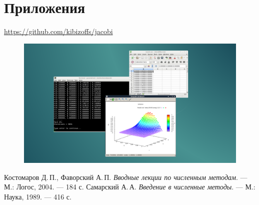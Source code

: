 \documentclass[a4paper, fleqn]{report}
\begin{document}
\chapter*{Приложения}

\href{https://github.com/kibizoffs/jacobi}{https://github.com/kibizoffs/jacobi}
\begin{figure}[h]
    \centering
    \includegraphics[width=1\textwidth]{preview.png}
\end{figure}

\begin{thebibliography}{2}
\renewcommand{\bibname}{Литература}
Костомаров Д.\,П., Фаворский А.\,П. \textit{Вводные лекции по численным методам}. — М.: Логос, 2004. — 184 с.
Самарский А.\,А. \textit{Введение в численные методы}. — М.: Наука, 1989. — 416 с.
\end{thebibliography}
\end{document}
